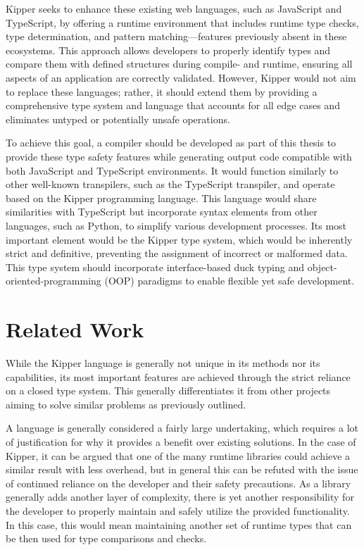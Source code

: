 Kipper seeks to enhance these existing web languages, such as JavaScript and TypeScript, by offering a runtime environment that includes runtime type checks, type determination, and pattern matching—features previously absent in these ecosystems. This approach allows developers to properly identify types and compare them with defined structures during compile- and runtime, ensuring all aspects of an application are correctly validated. However, Kipper would not aim to replace these languages; rather, it should extend them by providing a comprehensive type system and language that accounts for all edge cases and eliminates untyped or potentially unsafe operations.

To achieve this goal, a compiler should be developed as part of this thesis to provide these type safety features while generating output code compatible with both JavaScript and TypeScript environments. It would function similarly to other well-known \gls{transpiler}s, such as the TypeScript transpiler, and operate based on the Kipper programming language. This language would share similarities with TypeScript but incorporate syntax elements from other languages, such as Python, to simplify various development processes. Its most important element would be the Kipper type system, which would be inherently strict and definitive, preventing the assignment of incorrect or malformed data. This type system should incorporate interface-based duck typing and \gls{object-oriented-programming} (OOP) paradigms to enable flexible yet safe development.

\section{Related Work}

While the Kipper language is generally not unique in its methods nor its capabilities, its most important features are achieved through the strict reliance on a closed type system. This generally differentiates it from other projects aiming to solve similar problems as previously outlined.

A language is generally considered a fairly large undertaking, which requires a lot of justification for why it provides a benefit over existing solutions. In the case of Kipper, it can be argued that one of the many runtime libraries could achieve a similar result with less overhead, but in general this can be refuted with the issue of continued reliance on the developer and their safety precautions. As a library generally adds another layer of complexity, there is yet another responsibility for the developer to properly maintain and safely utilize the provided functionality. In this case, this would mean maintaining another set of runtime types that can be then used for type comparisons and checks. 

